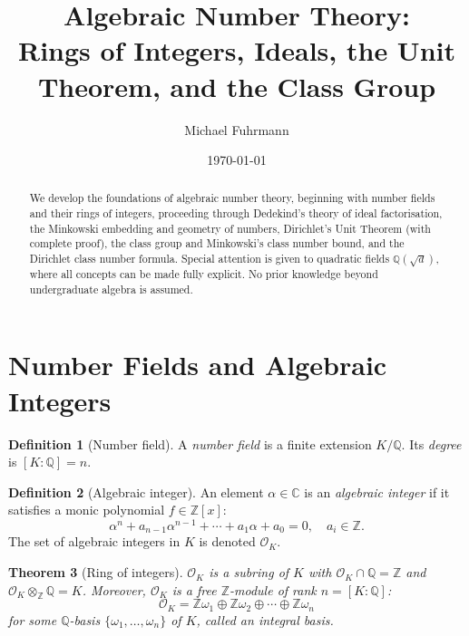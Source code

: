 \documentclass[12pt,a4paper]{amsart}
\newtheorem{theorem}{Theorem}[section]
\theoremstyle{definition}
\newtheorem{definition}[theorem]{Definition}
\newcommand{\Z}{\mathbb{Z}}
\newcommand{\Q}{\mathbb{Q}}
\newcommand{\C}{\mathbb{C}}
\newcommand{\OK}{\mathcal{O}_K}
\begin{document}

\title{Algebraic Number Theory:\\
       Rings of Integers, Ideals, the Unit Theorem, and the Class Group}

\author{Michael Fuhrmann}
\address{Specialist Mathematics Project, Build 119}
\date{\today}

\begin{abstract}
We develop the foundations of algebraic number theory, beginning with
number fields and their rings of integers, proceeding through Dedekind's
theory of ideal factorisation, the Minkowski embedding and geometry of
numbers, Dirichlet's Unit Theorem (with complete proof), the class group
and Minkowski's class number bound, and the Dirichlet class number formula.
Special attention is given to quadratic fields $\Q(\sqrt{d})$, where all
concepts can be made fully explicit.  No prior knowledge beyond undergraduate
algebra is assumed.
\end{abstract}

\maketitle
\tableofcontents

\section{Number Fields and Algebraic Integers}

\begin{definition}[Number field]
\label{def:number_field}
A \emph{number field} is a finite extension $K/\Q$.  Its \emph{degree}
is $[K:\Q] = n$.
\end{definition}

\begin{definition}[Algebraic integer]
\label{def:alg_int}
An element $\alpha \in \C$ is an \emph{algebraic integer} if it satisfies
a monic polynomial $f \in \Z[x]$:
\[
  \alpha^n + a_{n-1}\alpha^{n-1} + \cdots + a_1\alpha + a_0 = 0,
  \quad a_i \in \Z.
\]
The set of algebraic integers in $K$ is denoted $\OK$.
\end{definition}

\begin{theorem}[Ring of integers]
\label{thm:OK_ring}
$\OK$ is a subring of $K$ with $\OK \cap \Q = \Z$ and $\OK \otimes_\Z \Q = K$.
Moreover, $\OK$ is a free $\Z$-module of rank $n = [K:\Q]$:
\[
  \OK = \Z\omega_1 \oplus \Z\omega_2 \oplus \cdots \oplus \Z\omega_n
\]
for some $\Q$-basis $\{\omega_1, \ldots, \omega_n\}$ of $K$, called an
\emph{integral basis}.
\end{theorem}
\end{document}
